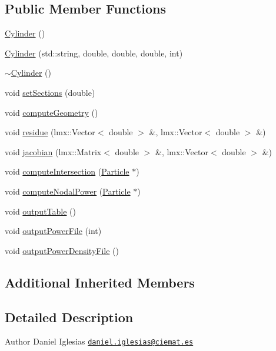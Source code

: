 \subsection*{Public Member Functions}
\begin{DoxyCompactItemize}
\item 
\hyperlink{classCylinder_a01dc978cb576f834b9545e43d4dad2a2}{Cylinder} ()
\item 
\hyperlink{classCylinder_af6f22d1e11f65fc230f270c16e25385a}{Cylinder} (std\-::string, double, double, double, int)
\item 
\hyperlink{classCylinder_a05ab556f0ae3cd6e99d9d1f3caca80b3}{$\sim$\-Cylinder} ()
\item 
void \hyperlink{classCylinder_ad75a4b81272ef8b27b3163bf0aa49efd}{set\-Sections} (double)
\item 
void \hyperlink{classCylinder_a657d003c8da54cb8d5cf78bbe210cafa}{compute\-Geometry} ()
\item 
void \hyperlink{classCylinder_a76a83ba9168f8a9bc30bf0a85250f984}{residue} (lmx\-::\-Vector$<$ double $>$ \&, lmx\-::\-Vector$<$ double $>$ \&)
\item 
void \hyperlink{classCylinder_a27c6e57d5f10da5fc660adf731960d6f}{jacobian} (lmx\-::\-Matrix$<$ double $>$ \&, lmx\-::\-Vector$<$ double $>$ \&)
\item 
void \hyperlink{classCylinder_a3785595915b105f5e387a4b76d0d6ee9}{compute\-Intersection} (\hyperlink{classParticle}{Particle} $\ast$)
\item 
void \hyperlink{classCylinder_a950b48028c934fa9f01cb3ae40422aef}{compute\-Nodal\-Power} (\hyperlink{classParticle}{Particle} $\ast$)
\item 
void \hyperlink{classCylinder_a33abcb99e6c881b867a0bb6c0dfcabae}{output\-Table} ()
\item 
void \hyperlink{classCylinder_ab2481ec0318f4686fd7787696230b4bd}{output\-Power\-File} (int)
\item 
void \hyperlink{classCylinder_a82078ecb74fbe07bed3de4040be73125}{output\-Power\-Density\-File} ()
\end{DoxyCompactItemize}
\subsection*{Additional Inherited Members}


\subsection{Detailed Description}
\begin{DoxyAuthor}{Author}
Daniel Iglesias \href{mailto:daniel.iglesias@ciemat.es}{\tt daniel.\-iglesias@ciemat.\-es} 
\end{DoxyAuthor}


